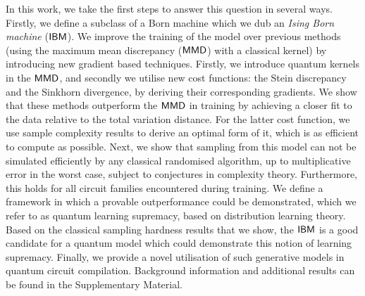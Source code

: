 In this work, we take the first steps to answer this question in several ways. Firstly, we define a subclass of a Born machine which we dub an \emph{Ising Born machine} ($\textsf{IBM}$). We improve the training of the model over previous methods (using the maximum mean discrepancy\cite{liu_differentiable_2018} ($\operatorname{\textsf{MMD}}$) with a classical kernel) by introducing new gradient based techniques. Firstly, we introduce quantum kernels in the $\operatorname{\textsf{MMD}}$, and secondly we utilise new cost functions: the Stein discrepancy and the Sinkhorn divergence, by deriving their corresponding gradients. We show that these methods outperform the $\operatorname{\textsf{MMD}}$ in training by achieving a closer fit to the data relative to the total variation distance. For the latter cost function, we use sample complexity results to derive an optimal form of it, which is as efficient to compute as possible. Next, we show that sampling from this model can not be simulated efficiently by any classical randomised algorithm, up to multiplicative error in the worst case, subject to conjectures in complexity theory. Furthermore, this holds for all circuit families encountered during training. We define a framework in which a provable outperformance could be demonstrated, which we refer to as quantum learning supremacy, based on distribution learning theory\cite{kearns_learnability_1994}. Based on the classical sampling hardness results that we show, the $\textsf{IBM}$ is a good candidate for a quantum model which could demonstrate this notion of learning supremacy. Finally, we provide a novel utilisation of such generative models in quantum circuit compilation. Background information and additional results can be found in the Supplementary Material.



